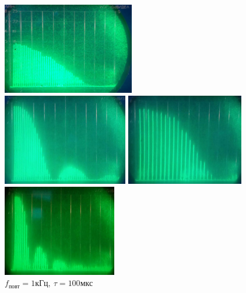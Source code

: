 \documentclass{article}
\begin{document}
   \begin{figure}[h!]
   \begin{minipage}[h!]{0.49\linewidth}
   \centering
   \includegraphics[height=4cm]{A01.jpg} 
   \caption{$f_{\text{повт}} = 1 \text{кГц},~ \tau = 25 \text{мкс}$} 
   \label{fig.a01} 
   \end{minipage}
   \hfill
   \begin{minipage}[h!]{0.49\linewidth}
   \centering
   \includegraphics[height=4cm]{A02.jpg} 
   \caption{$f_{\text{повт}} = 1 \text{кГц},~ \tau = 50 \text{мкс}$} 
   \label{fig.a02}
   \end{minipage}
   \hfill
   \begin{minipage}[h!]{0.49\linewidth}
   \centering
   \includegraphics[height=4cm]{A03.jpg} 
   \caption{$f_{\text{повт}} = 2 \text{кГц},~ \tau = 25 \text{мкс}$} 
   \label{fig.a03}
   \end{minipage}
   \hfill
   \begin{minipage}[h!]{0.49\linewidth}
   \centering
   \includegraphics[height=4cm]{A04.jpg} 
   \caption{$f_{\text{повт}} = 1 \text{кГц},~ \tau = 100 \text{мкс}$} 
   \label{fig.a04}
   \end{minipage}  
   \end{figure}
\end{document}
